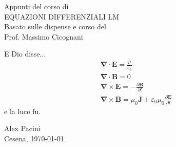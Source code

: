 \begin{titlepage}
\begin{center}
\vfill
%
{\LARGE{\sc Appunti del corso di}}\\
\vspace{10mm} 
{\Huge {EQUAZIONI DIFFERENZIALI LM}} \\
\vspace{15mm}
{\LARGE{Basato sulle dispense e corso del}}\\
{\LARGE{Prof. Massimo Cicognani}}\\
\end{center}
%
\vspace{25mm}
\LARGE {E Dio disse...}
%
\begin{align*}
& \boldsymbol{\nabla} \cdot \boldsymbol{E} = \frac{\rho}{\varepsilon_0} \\
& \boldsymbol{\nabla} \cdot \boldsymbol{B} = 0 \\
& \boldsymbol{\nabla} \times \boldsymbol{E} = - \frac{\partial \boldsymbol{B}}{\partial t} \\
& \boldsymbol{\nabla} \times \boldsymbol{B} = \mu_0 \boldsymbol{J} + \varepsilon_0 \mu_0 \frac{\partial \boldsymbol{E}}{\partial t}
\end{align*}
%
\LARGE e la luce fu.
%
\vfill
\begin{center}
{\Large {Alex Pacini}}\\
\vspace{5mm}
{\large Cesena, \today}
\end{center}


\end{titlepage}
